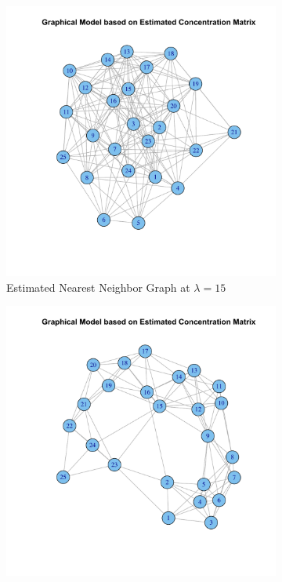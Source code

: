 \documentclass[12pt, leqno]{article}
\begin{document}
\begin{figure}
\centering 
\begin{subfigure}[b]{0.40\textwidth}
  \includegraphics[width=\textwidth]{nearestestimategraph15.pdf}
  \caption{Estimated Nearest Neighbor Graph at $\lambda = 15$}
\label{fig:nearestgaphsestimate}
\end{subfigure}
\begin{subfigure}[b]{0.40\textwidth}
  \includegraphics[width=\textwidth]{nearestestimategraph30.pdf}

\end{subfigure}
\end{figure}
\end{document}
